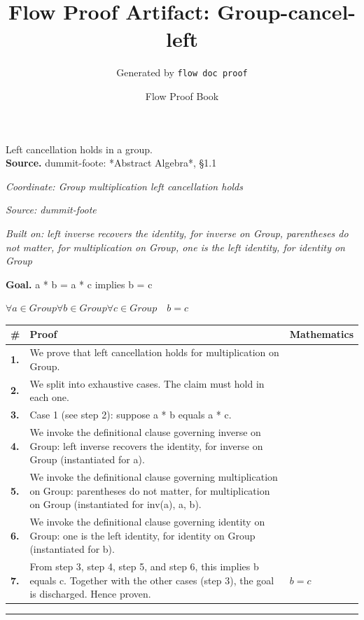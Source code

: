 \documentclass[11pt]{article}
\title{Flow Proof Artifact: Group-cancel-left}
\author{Generated by \texttt{flow doc proof}}
\date{Flow Proof Book}
\theoremstyle{definition}
\begin{document}
\maketitle
Left cancellation holds in a group.\\[0.5em]
\textbf{Source.} dummit-foote: *Abstract Algebra*, §1.1\\[0.5em]
\bigskip
{}\par
\smallskip\noindent\textit{Coordinate: Group \cdot multiplication \cdot left cancellation holds}\par
\smallskip\noindent\textit{Source: dummit-foote}\par
\smallskip\noindent\textit{Built on: left inverse recovers the identity, for inverse on Group, parentheses do not matter, for multiplication on Group, one is the left identity, for identity on Group}\par
\medskip
\noindent\textbf{Goal.} a * b = a * c implies b = c\par
\noindent$\displaystyle \forall a \in Group \forall b \in Group \forall c \in Group\quad b = c$\par
\medskip
\noindent
\begin{tabular}{@{} >{\raggedright\arraybackslash}p{} >{\raggedright\arraybackslash}p{} >{\raggedleft\arraybackslash}p{} @{}}
\textbf{\#} & \textbf{Proof} & \textbf{Mathematics} \\
\midrule
\textbf{1.} & We prove that left cancellation holds for multiplication on Group. & \\[0.45em]
\textbf{2.} & We split into exhaustive cases. The claim must hold in each one. & \\[0.45em]
\textbf{3.} & Case 1 (see step 2): suppose a * b  equals  a * c. & \\[0.45em]
\textbf{4.} & We invoke the definitional clause governing inverse on Group: left inverse recovers the identity, for inverse on Group (instantiated for a). & \\[0.45em]
\textbf{5.} & We invoke the definitional clause governing multiplication on Group: parentheses do not matter, for multiplication on Group (instantiated for inv(a), a, b). & \\[0.45em]
\textbf{6.} & We invoke the definitional clause governing identity on Group: one is the left identity, for identity on Group (instantiated for b). & \\[0.45em]
\textbf{7.} & From step 3, step 4, step 5, and step 6, this implies b equals c. Together with the other cases (step 3), the goal is discharged. Hence proven. & $\displaystyle b = c$ \\[0.45em]
\bottomrule
\end{tabular}
\label{thm:Group-multiplication-left_cancellation_holds}
\par\medskip\hrule
\end{document}
